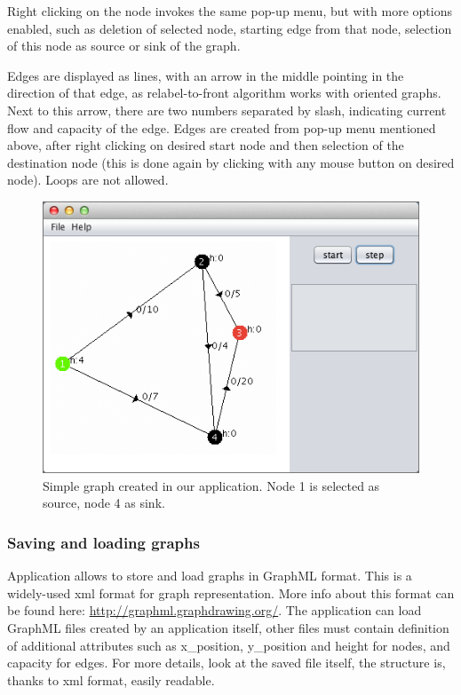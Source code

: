 \documentclass[a4paper,11pt]{article}
\begin{document}
Right clicking on the node invokes the same pop-up menu, but with more options 
enabled, such as deletion of selected node, starting edge from that node, selection 
of this node as source or sink of the graph.

Edges are displayed as lines, with an arrow in the middle pointing in the 
direction of that edge, as relabel-to-front algorithm works with oriented graphs. 
Next to this arrow, there are two numbers separated by slash, indicating current 
flow and capacity of the edge. Edges are created from pop-up menu mentioned above, 
after right clicking on desired start node and then selection of the destination 
node (this is done again by clicking with any mouse button on desired node). 
Loops are not allowed.

\begin{figure}[H]
\centering
\includegraphics[width=12cm]{1.png}
\caption{Simple graph created in our application. Node 1 is selected as source, node 4 as sink.}
\label{pic1}
\end{figure}

\subsubsection*{Saving and loading graphs}
Application allows to store and load graphs in GraphML format. This is a widely-used 
xml format for graph representation. More info about this format can be found here: 
\url{http://graphml.graphdrawing.org/}. The application can load GraphML files created
by an application itself, other files must contain definition of additional attributes
such as x\_position, y\_position and height for nodes, and capacity for edges. For more
details, look at the saved file itself, the structure is, thanks to xml format, 
easily readable. 
\end{document}
